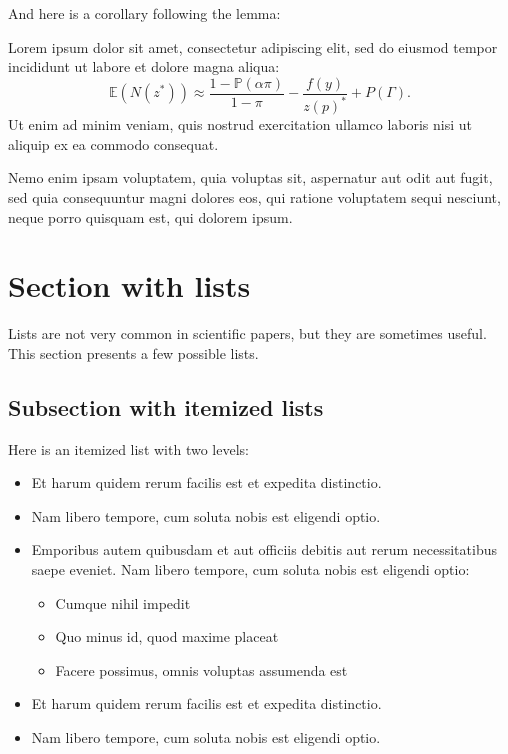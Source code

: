 \documentclass[letterpaper,11pt,leqno]{article}
\begin{document}
And here is a corollary following the lemma:

\begin{corollary} Lorem ipsum dolor sit amet, consectetur adipiscing elit, sed do eiusmod tempor incididunt ut labore et dolore magna aliqua:
\begin{equation*}
\mathbb{E}(N(z^*)) \approx \frac{1-\mathbb{P}(\alpha\pi)}{1-\pi}- \frac{f(y)}{z(p)^*} + P(\Gamma).
\end{equation*}
Ut enim ad minim veniam, quis nostrud exercitation ullamco laboris nisi ut aliquip ex ea commodo consequat.\end{corollary}

Nemo enim ipsam voluptatem, quia voluptas sit, aspernatur aut odit aut fugit, sed quia consequuntur magni dolores eos, qui ratione voluptatem sequi nesciunt, neque porro quisquam est, qui dolorem ipsum.

\section{Section with lists}\label{s:lists}

Lists are not very common in scientific papers, but they are sometimes useful. This section presents a few possible lists.

\subsection{Subsection with itemized lists}

Here is an itemized list with two levels:
\begin{itemize}
\item Et harum quidem rerum facilis est et expedita distinctio.
\item Nam libero tempore, cum soluta nobis est eligendi optio.
\item Emporibus autem quibusdam et aut officiis debitis aut rerum necessitatibus saepe eveniet. Nam libero tempore, cum soluta nobis est eligendi optio:
\begin{itemize}
\item Cumque nihil impedit
\item Quo minus id, quod maxime placeat
\item Facere possimus, omnis voluptas assumenda est
\end{itemize}
\item Et harum quidem rerum facilis est et expedita distinctio.
\item Nam libero tempore, cum soluta nobis est eligendi optio.
\end{itemize}
\end{document}
